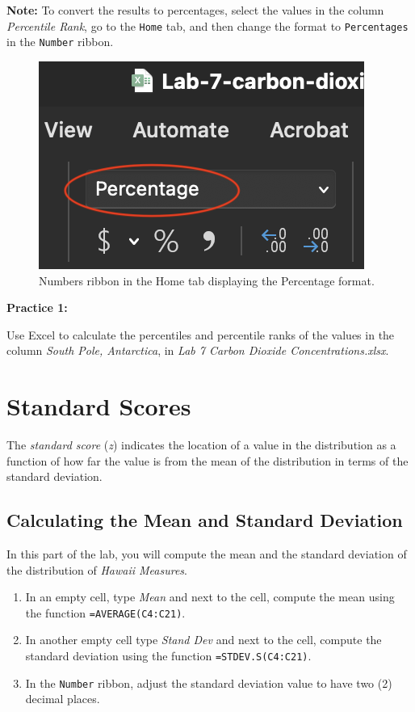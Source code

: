 \documentclass[
]{book}
\providecommand{\tightlist}{%
  \setlength{\itemsep}{0pt}\setlength{\parskip}{0pt}}
\begin{document}
\textbf{Note:} To convert the results to percentages, select the values in the column \emph{Percentile Rank}, go to the \texttt{Home} tab, and then change the format to \texttt{Percentages} in the \texttt{Number} ribbon.

\begin{figure}

{\centering \includegraphics[width=0.35\linewidth]{number-ribon-percentages} 

}

\caption{Numbers ribbon in the Home tab displaying the Percentage format.}\label{fig:number-ribon-percentages}
\end{figure}

\textbf{Practice 1:}

Use Excel to calculate the percentiles and percentile ranks of the values in the column \emph{South Pole, Antarctica}, in \emph{Lab 7 Carbon Dioxide Concentrations.xlsx}.

\hypertarget{standard-scores}{%
\section{Standard Scores}\label{standard-scores}}

The \emph{standard score} (\emph{z}) indicates the location of a value in the distribution as a function of how far the value is from the mean of the distribution in terms of the standard deviation.

\hypertarget{mean-st-dev}{%
\subsection{Calculating the Mean and Standard Deviation}\label{mean-st-dev}}

In this part of the lab, you will compute the mean and the standard deviation of the distribution of \emph{Hawaii Measures}.

\begin{enumerate}
\def\labelenumi{\arabic{enumi}.}
\tightlist
\item
  In an empty cell, type \emph{Mean} and next to the cell, compute the mean using the function \texttt{=AVERAGE(C4:C21)}.
\item
  In another empty cell type \emph{Stand Dev} and next to the cell, compute the standard deviation using the function \texttt{=STDEV.S(C4:C21)}.
\item
  In the \texttt{Number} ribbon, adjust the standard deviation value to have two (2) decimal places.
\end{enumerate}
\end{document}
